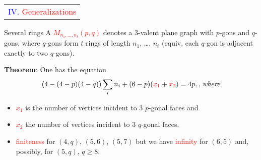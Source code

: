 \documentclass[%
pdf,
colorBG,
slideColor,
]{prosper}
\begin{document}
\begin{slide}{}
\begin{center}
{\Huge 
\begin{tabular*}{8cm}{c}
\\[-0.5cm]
\textcolor{blue}{IV. }\textcolor{red}{Generalizations}\\
\end{tabular*}
}
\end{center}
\end{slide}




\begin{slide}{Several rings}
A \textcolor{red}{$M_{n_1,\dots, n_t}(p,q)$} denotes a $3$-valent plane graph with $p$-gons and $q$-gons, where $q$-gons form $t$ rings of length $n_1$, \dots, $n_t$ (equiv. each $q$-gon is adjacent exactly to two $q$-gons).

{\it

{\bf Theorem}: One has the equation
\begin{equation*}
(4-(4-p)(4-q))\sum_i n_i+(6-p)(\textcolor{red}{x_1}+\textcolor{red}{x_2})=4p, \mbox{,~{\em where}}
\end{equation*}
\begin{itemize}
\item \textcolor{red}{$x_1$} is the number of vertices incident to $3$ $p$-gonal faces and
\item \textcolor{red}{$x_2$} the number of vertices incident to $3$ $q$-gonal faces.
\end{itemize}

}
\begin{itemize}
\item[\ding{224}] \textcolor{red}{finiteness} for $(4,q)$, $(5,6)$, $(5,7)$ but we have \textcolor{red}{infinity} for $(6,5)$ and, possibly, for $(5,q)$, $q\geq 8$.


\end{itemize}

\end{slide}
\end{document}
